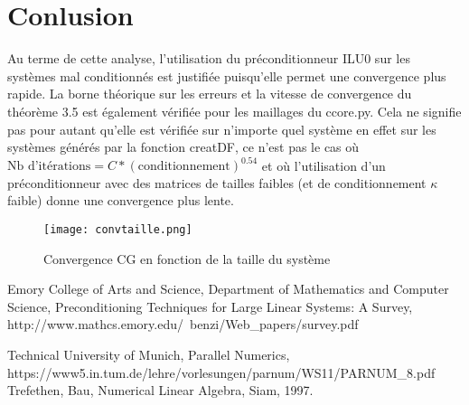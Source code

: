 \documentclass[11pt]{article}
\begin{document}
\section{Conlusion}
Au terme de cette analyse, l'utilisation du préconditionneur ILU0 sur les systèmes mal conditionnés est justifiée puisqu'elle permet une convergence plus rapide. La borne théorique sur les erreurs et la vitesse de convergence du théorème 3.5 est également vérifiée pour les maillages du ccore.py. Cela ne signifie pas pour autant qu'elle est vérifiée sur n'importe quel système en effet sur les systèmes générés par la fonction creatDF, ce n'est pas le cas où $\mbox{Nb d'itérations} = C * (\mbox{conditionnement})^{0.54}$ et où l'utilisation d'un préconditionneur avec des matrices de tailles faibles (et de conditionnement $\kappa$ faible) donne une convergence plus lente.
\begin{figure}[h!]
    \vspace*{-4mm}
    \centering
    \texttt{[image: convtaille.png]}
        \vspace*{-4mm}
    \caption{Convergence CG en fonction de la taille du système}
    \label{fig:sys}
    \vspace*{-7mm}

\end{figure}
\begin{thebibliography}{00}
\tiny
{} Emory College of Arts and Science, Department of Mathematics and Computer Science, Preconditioning Techniques for Large Linear
Systems: A Survey, http://www.mathcs.emory.edu/~benzi/Web\_papers/survey.pdf

 Technical University of Munich, Parallel Numerics, https://www5.in.tum.de/lehre/vorlesungen/parnum/WS11/PARNUM\_8.pdf
 Trefethen, Bau, Numerical Linear Algebra, Siam, 1997.
\end{thebibliography}
\end{document}
